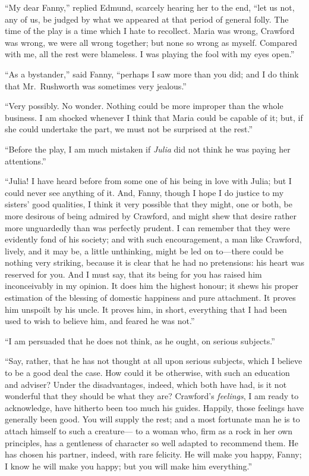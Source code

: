 \documentclass{article}
\begin{document}
``My dear Fanny,'' replied Edmund, scarcely hearing her
to the end, ``let us not, any of us, be judged by what we
appeared at that period of general folly.  The time of the
play is a time which I hate to recollect.  Maria was wrong,
Crawford was wrong, we were all wrong together; but none
so wrong as myself.  Compared with me, all the rest
were blameless.  I was playing the fool with my eyes open.''

``As a bystander,'' said Fanny, ``perhaps I saw more than
you did; and I do think that Mr.\ Rushworth was sometimes
very jealous.''

``Very possibly.  No wonder.  Nothing could be more improper
than the whole business.  I am shocked whenever I think
that Maria could be capable of it; but, if she could
undertake the part, we must not be surprised at the rest.''

``Before the play, I am much mistaken if \emph{Julia} did
not think he was paying her attentions.''

``Julia!  I have heard before from some one of his being
in love with Julia; but I could never see anything of it.
And, Fanny, though I hope I do justice to my sisters'
good qualities, I think it very possible that they might,
one or both, be more desirous of being admired by Crawford,
and might shew that desire rather more unguardedly than was
perfectly prudent.  I can remember that they were evidently
fond of his society; and with such encouragement, a man
like Crawford, lively, and it may be, a little unthinking,
might be led on to---there could be nothing very striking,
because it is clear that he had no pretensions:  his heart
was reserved for you.  And I must say, that its being
for you has raised him inconceivably in my opinion.
It does him the highest honour; it shews his proper estimation
of the blessing of domestic happiness and pure attachment.
It proves him unspoilt by his uncle.  It proves him, in short,
everything that I had been used to wish to believe him,
and feared he was not.''

``I am persuaded that he does not think, as he ought,
on serious subjects.''

``Say, rather, that he has not thought at all upon serious
subjects, which I believe to be a good deal the case.
How could it be otherwise, with such an education and adviser?
Under the disadvantages, indeed, which both have had,
is it not wonderful that they should be what they are?
Crawford's \emph{feelings}, I am ready to acknowledge, have hitherto
been too much his guides.  Happily, those feelings have
generally been good.  You will supply the rest; and a most
fortunate man he is to attach himself to such a creature---%
to a woman who, firm as a rock in her own principles, has a
gentleness of character so well adapted to recommend them.
He has chosen his partner, indeed, with rare felicity.
He will make you happy, Fanny; I know he will make you happy;
but you will make him everything.''
\end{document}

